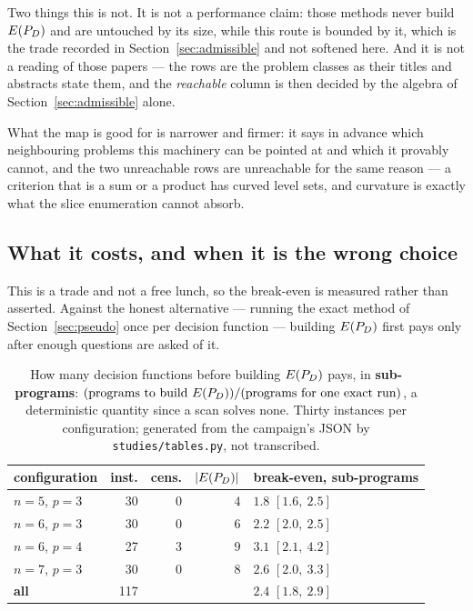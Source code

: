 \documentclass[11pt,a4paper]{article}
\begin{document}
Two things this is not.  It is not a performance claim: those methods never
build $E(P_{D})$ and are untouched by its size, while this route is bounded by it,
which is the trade recorded in Section~\ref{sec:admissible} and not softened
here.  And it is not a reading of those papers --- the rows are the problem
classes as their titles and abstracts state them, and the \emph{reachable}
column is then decided by the algebra of Section~\ref{sec:admissible} alone.

What the map is good for is narrower and firmer: it says in advance which
neighbouring problems this machinery can be pointed at and which it provably
cannot, and the two unreachable rows are unreachable for the same reason --- a
criterion that is a sum or a product has curved level sets, and curvature is
exactly what the slice enumeration cannot absorb.

\subsection{What it costs, and when it is the wrong choice}

This is a trade and not a free lunch, so the break-even is measured rather than
asserted.  Against the honest alternative --- running the exact method of
Section~\ref{sec:pseudo} once per decision function --- building $E(P_{D})$ first
pays only after enough questions are asked of it.

\begin{table}[h]
\centering
\caption{How many decision functions before building $E(P_{D})$ pays, in
\textbf{sub-programs}: $(\text{programs to build } E(P_{D}))/(\text{programs for
one exact run})$, a deterministic quantity since a scan solves none.  Thirty
instances per configuration; generated from the campaign's JSON by
\texttt{studies/tables.py}, not transcribed.}
\label{tab:breakeven}
\begin{tabular}{lrrrl}
\toprule
configuration & inst. & cens. & $|E(P_{D})|$ & break-even, sub-programs \\
\midrule
$n=5$, $p=3$ & 30 & 0 & $4$ & $\mathbf{1.8}$ $[1.6,\ 2.5]$ \\
$n=6$, $p=3$ & 30 & 0 & $6$ & $\mathbf{2.2}$ $[2.0,\ 2.5]$ \\
$n=6$, $p=4$ & 27 & 3 & $9$ & $\mathbf{3.1}$ $[2.1,\ 4.2]$ \\
$n=7$, $p=3$ & 30 & 0 & $8$ & $\mathbf{2.6}$ $[2.0,\ 3.3]$ \\
\midrule
\textbf{all} & 117 & & & $\mathbf{2.4}$ $[1.8,\ 2.9]$ \\
\bottomrule
\end{tabular}
\end{table}
\end{document}
